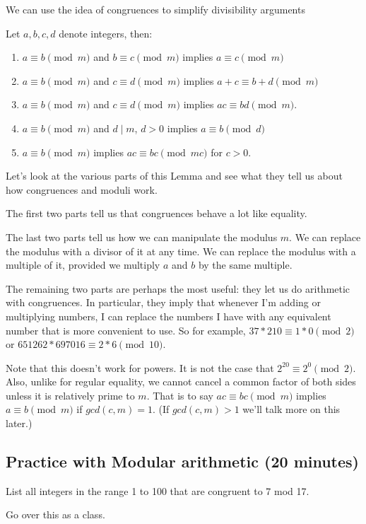 \documentclass[letterpaper, 11 pt]{ximera}
\begin{document}
We can use the idea of congruences to simplify divisibility arguments

\begin{br}
 Let $a,b,c,d$ denote integers, then:
\begin{enumerate}
\item $a\equiv b \pmod{m}$ and $b\equiv c \pmod{m}$ implies $a\equiv c \pmod{m}$
\item\label{add} $a\equiv b \pmod{m}$ and $c\equiv d \pmod{m}$ implies $a+c \equiv b+d \pmod{m}$ 
\item\label{multiply} $a\equiv b\pmod{m}$ and $c\equiv d \pmod{m}$ implies $ac\equiv bd \pmod{m}$.
\item $a\equiv b \pmod{m}$ and $d\mid m$, $d>0$ implies $a\equiv b \pmod{d}$
\item $a\equiv b \pmod{m}$ implies $ac\equiv bc \pmod{mc}$ for $c>0$.
\end{enumerate}
\end{br}

Let's look at the various parts of this Lemma and see what they tell us about how congruences and moduli work.

The first two parts tell us that congruences behave a lot like equality. 

The last two parts tell us how we can manipulate the modulus $m$. We can replace the modulus with a divisor of it at any time. We can replace the modulus with a multiple of it, provided we multiply $a$ and $b$ by the same multiple.

The remaining two parts are perhaps the most useful: they let us do arithmetic with congruences. In particular, they imply that whenever I'm adding or multiplying numbers, I can replace the numbers I have with any equivalent number that is more convenient to use. So for example, $37*210\equiv 1*0 \pmod{2}$ or $651262*697016 \equiv 2*6 \pmod{10}$.

Note that this doesn't work for powers. It is not the case that $2^{20} \equiv 2^0 \pmod{2}$. Also, unlike for regular equality, we cannot cancel a common factor of both sides unless it is relatively prime to $m$. That is to say $ac \equiv bc \pmod{m}$ implies $a\equiv b \pmod{m}$ if $gcd(c,m)=1$. (If $gcd(c,m)>1$ we'll talk more on this later.)






\subsection{Practice with Modular arithmetic (20 minutes)}
\begin{br}[5 minutes]
 List all integers in the range 1 to 100 that are congruent to 7 mod 17. 
\end{br}

Go over this as a class. 
\end{document}
